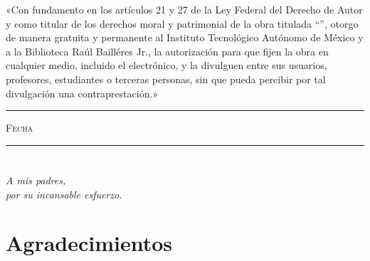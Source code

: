 \documentclass[11pt, oneside]{book}
\theoremstyle{definition}
\begin{document}
\thispagestyle{empty}

\vspace*{\fill}
\begingroup

\noindent
\makeatletter
«Con fundamento en los artículos 21 y 27 de la Ley Federal del Derecho de Autor y como 
titular de los derechos moral y patrimonial de la obra titulada ``\textbf{\@title}'', 
otorgo de manera gratuita y permanente al Instituto Tecnológico Autónomo de México y a la 
Biblioteca Raúl Bailléres Jr., la autorización para que fijen la obra en cualquier medio, 
incluido el electrónico, y la divulguen entre sus usuarios, profesores, estudiantes o 
terceras personas, sin que pueda percibir por tal divulgación una contraprestación.»


\centering 

\vspace{5em}

\rule[1em]{20em}{0.5pt} %

\textsc{Fecha}
 
\vspace{8em}

\rule[1em]{20em}{0.5pt} %

\textsc{\@author}

\endgroup
\vspace*{\fill}
\makeatother


\pagestyle{plain}
\frontmatter

\chapter*{}
\begin{flushright}
\textit{A mis padres,\\ por su incansable esfuerzo.}
\end{flushright}


\chapter*{Agradecimientos}
\end{document}
